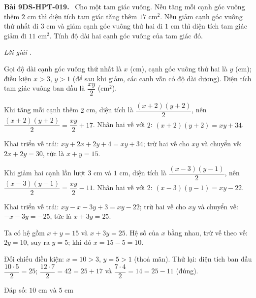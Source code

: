 \documentclass[12pt,a4paper]{article}
\newenvironment{problem}[1][]{\par\medskip\noindent\textbf{Bài #1.}\ }{\par}
\newenvironment{solution}[1][]{\par\noindent\textit{Lời giải #1.}\par}{\par}
\begin{document}
\begin{problem}[9DS-HPT-019]
Cho một tam giác vuông. Nếu tăng mỗi cạnh góc vuông thêm $2$ cm thì diện tích tam giác tăng thêm $17$ cm$^2$. Nếu giảm cạnh góc vuông thứ nhất đi $3$ cm và giảm cạnh góc vuông thứ hai đi $1$ cm thì diện tích tam giác giảm đi $11$ cm$^2$. Tính độ dài hai cạnh góc vuông của tam giác đó.

\begin{solution}
Gọi độ dài cạnh góc vuông thứ nhất là $x$ (cm), cạnh góc vuông thứ hai là $y$ (cm); điều kiện $x > 3$, $y > 1$ (để sau khi giảm, các cạnh vẫn có độ dài dương). Diện tích tam giác vuông ban đầu là $\dfrac{xy}{2}$ (cm$^2$).

Khi tăng mỗi cạnh thêm $2$ cm, diện tích là $\dfrac{(x + 2)(y + 2)}{2}$, nên $\dfrac{(x + 2)(y + 2)}{2} = \dfrac{xy}{2} + 17$. Nhân hai vế với $2$: $(x + 2)(y + 2) = xy + 34$.

Khai triển vế trái: $xy + 2x + 2y + 4 = xy + 34$; trừ hai vế cho $xy$ và chuyển vế: $2x + 2y = 30$, tức là $x + y = 15$.

Khi giảm hai cạnh lần lượt $3$ cm và $1$ cm, diện tích là $\dfrac{(x - 3)(y - 1)}{2}$, nên $\dfrac{(x - 3)(y - 1)}{2} = \dfrac{xy}{2} - 11$. Nhân hai vế với $2$: $(x - 3)(y - 1) = xy - 22$.

Khai triển vế trái: $xy - x - 3y + 3 = xy - 22$; trừ hai vế cho $xy$ và chuyển vế: $-x - 3y = -25$, tức là $x + 3y = 25$.

Ta có hệ gồm $x + y = 15$ và $x + 3y = 25$. Hệ số của $x$ bằng nhau, trừ vế theo vế: $2y = 10$, suy ra $y = 5$; khi đó $x = 15 - 5 = 10$.

Đối chiếu điều kiện: $x = 10 > 3$, $y = 5 > 1$ (thoả mãn). Thử lại: diện tích ban đầu $\dfrac{10 \cdot 5}{2} = 25$; $\dfrac{12 \cdot 7}{2} = 42 = 25 + 17$ và $\dfrac{7 \cdot 4}{2} = 14 = 25 - 11$ (đúng).

Đáp số: $\boxed{10 \text{ cm và } 5 \text{ cm}}$
\end{solution}
\end{problem}
\end{document}
